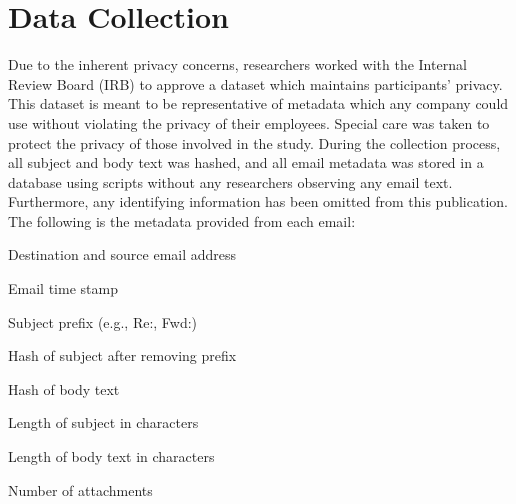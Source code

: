 \documentclass[12pt]{report}
\begin{document}
\section{Data Collection}
Due to the inherent privacy concerns, researchers worked with the Internal Review Board (IRB) to approve a dataset which maintains participants' privacy.
This dataset is meant to be representative of metadata which any company could use without violating the privacy of their employees.
Special care was taken to protect the privacy of those involved in the study.
During the collection process, all subject and body text was hashed, and all email metadata was stored in a database using scripts without any researchers observing any email text.
Furthermore, any identifying information has been omitted from this publication.
The following is the metadata provided from each email:
\begin{compactitem}
\item Destination and source email address
\item Email time stamp
\item Subject prefix (e.g., Re:, Fwd:)
\item Hash of subject after removing prefix
\item Hash of body text
\item Length of subject in characters
\item Length of body text in characters
\item Number of attachments
\end{compactitem}

\begin{table}[t]
\centering
\caption{A comparison between the internal dataset and the Enron email corpus.}
\label{tab:db_stats}
\end{table}
\end{document}
